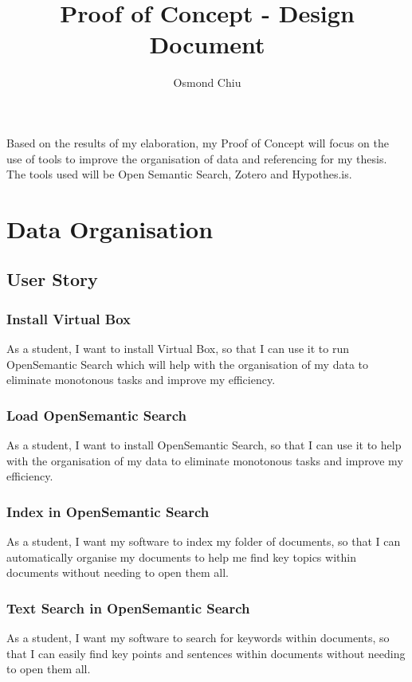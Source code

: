 \documentclass{article}
\title{Proof of Concept - Design Document}
\author{Osmond Chiu}
\begin{document}
\maketitle

Based on the results of my elaboration, my Proof of Concept will focus on the use of tools to improve the organisation of data and referencing for my thesis. The tools used will be Open Semantic Search, Zotero and Hypothes.is.

\section*{Data Organisation}
\subsection*{User Story}

\subsubsection*{Install Virtual Box}

As a student, I want to install Virtual Box, so that I can use it to run OpenSemantic Search which will help with the organisation of my data to eliminate monotonous tasks and improve my efficiency.

\subsubsection*{Load OpenSemantic Search}

As a student, I want to install OpenSemantic Search, so that I can use it to help with the organisation of my data to eliminate monotonous tasks and improve my efficiency.

\subsubsection*{Index in OpenSemantic Search}

As a student, I want my software to index my folder of documents, so that I can automatically organise my documents to help me find key topics within documents without needing to open them all.

\subsubsection*{Text Search in OpenSemantic Search}

As a student, I want my software to search for keywords within documents, so that I can easily find key points and sentences within documents without needing to open them all.
\end{document}
